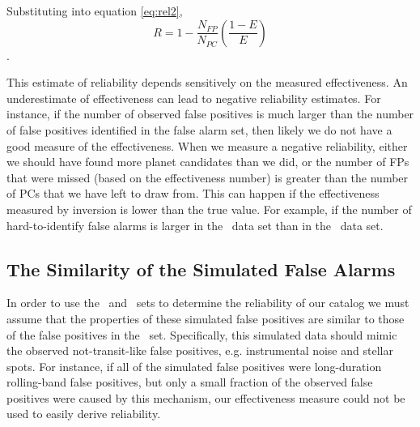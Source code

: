 Substituting into equation \ref{eq:rel2},
\textbf{
\begin{equation}
R= 1 - \frac{N_{FP}}{N_{PC}}\left(\frac{1-E}{E}\right)
\end{equation}
}.




This estimate of reliability depends sensitively on the measured effectiveness. An underestimate of effectiveness can lead to negative reliability estimates.  For instance, if the number of observed false positives is much larger than the number of false positives identified in the false alarm set, then likely we do not have a good measure of the effectiveness. When we measure a negative reliability, either we should have found more planet candidates than we did, or the number of FPs that were missed (based on the effectiveness number) is greater than the number of PCs that we have left to draw from.  This can happen if the effectiveness measured by inversion is lower than the true value. For example, if the number of hard-to-identify false alarms is larger in the \invtce\ data set than in the \opstce\ data set.   

\subsection{The Similarity of the Simulated False Alarms}
\label{s:simularity}
In order to use the \scrtce\ and \invtce\ sets to determine the reliability of our catalog we must assume that the properties of these simulated false positives are similar to those of the false positives in the \opstce\ set.  Specifically, this simulated data should mimic the observed not-transit-like false positives, e.g. instrumental noise and stellar spots.  For instance, if all of the simulated false positives were long-duration rolling-band false positives, but only a small fraction of the observed false positives were caused by this mechanism, our effectiveness measure could not be used to easily derive reliability.

